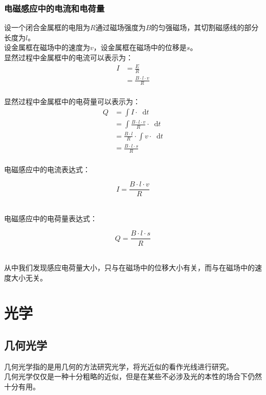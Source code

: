 \documentclass[UTF8]{ctexart}
\newcommand*{\dif}{\mathop{}\!\mathrm{d}}
\begin{document}
\newpage

\subsubsection{电磁感应中的电流和电荷量}
    设一个闭合金属框的电阻为$R$通过磁场强度为$B$的匀强磁场，其切割磁感线的部分长度为$l$。\\[3mm]
    设金属框在磁场中的速度为$v$，设金属框在磁场中的位移是$s$。\\[4mm]
    显然过程中金属框中的电流可以表示为：
    \begin{align}
        I
        &=\frac{E}{R}\\[4mm]
        &=\frac{B\cdot l\cdot v}{R}
    \end{align}\\
    显然过程中金属框中的电荷量可以表示为：
    \setcounter{equation}{0}
    \begin{align}
        Q
        &=\int I\cdot\dif t\\[4mm]
        &=\int \frac{B\cdot l\cdot v}{R}\cdot\dif t\\[4mm]
        &=\frac{B\cdot l}{R}\cdot\int v\cdot\dif t\\[4mm]
        &=\frac{B\cdot l\cdot s}{R} 
    \end{align}\\
    电磁感应中的电流表达式：
    \begin{large}
        \begin{equation*}
            I=\frac{B\cdot l\cdot v}{R}
        \end{equation*}
    \end{large}\\
    电磁感应中的电荷量表达式：
    \begin{large}
        \begin{equation*}
            Q=\frac{B\cdot l\cdot s}{R}
        \end{equation*}
    \end{large}\\
    从中我们发现感应电荷量大小，只与在磁场中的位移大小有关，而与在磁场中的速度大小无关。

\newpage

\section{光学}

\subsection{几何光学}
    几何光学指的是用几何的方法研究光学，将光近似的看作光线进行研究。\\[3mm]
    几何光学仅仅是一种十分粗略的近似，但是在某些不必涉及光的本性的场合下仍然十分有用。
\end{document}
